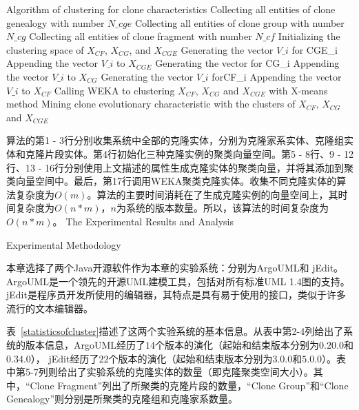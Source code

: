 \vspace{1em}
\begin{minipage}{0.9\textwidth}
\centering
\begin{algorithm}[H]
 {Algorithm of clustering for clone characteristics}
\label{alg-characteristic}
Collecting all entities of clone genealogy with number {$N\_cge$}\;
Collecting all entities of clone group with number{$N\_cg$}\;
Collecting all entities of clone fragment with number {$N\_cf$}\; 
Initializing the clustering space of  $X_{CF}$, $X_{CG}$, and $X_{CGE}$\;
{
 Generating the vector {$V\_i$} for {CGE\_i}\;
 Appending the vector {$V\_i$} to $X_{CGE}$\;
 }
{ 
 Generating the vector for {CG\_i}\;
 Appending the vector {$V\_i$} to $X_{CG}$\;
}
{ 
 Generating the vector {$V\_i$} for{CF\_i}\;
 Appending the vector {$V\_i$} to $X_{CF}$\;
}
Calling WEKA to clustering $X_{CF}$, $X_{CG}$ and  $X_{CGE}$ with X-means method\;
Mining clone evolutionary characteristic with the clusters of $X_{CF}$, $X_{CG}$ and  $X_{CGE}$\;
\end{algorithm}
\end{minipage}
\vspace{1em}

算法的第1 - 3行分别收集系统中全部的克隆实体，分别为克隆家系实体、克隆组实体和克隆片段实体。第4行初始化三种克隆实例的聚类向量空间。第5 - 8行、9 - 12行、13 - 16行分别使用上文描述的属性生成克隆实体的聚类向量，并将其添加到聚类向量空间中。最后，第17行调用WEKA聚类克隆实体。收集不同克隆实体的算法复杂度为$O(m)$。算法的主要时间消耗在了生成克隆实例的向量空间上，其时间复杂度为$O(n*m)$，$n$为系统的版本数量。所以，该算法的时间复杂度为$O(n*m)$。
{The Experimental Results and Analysis}
\label{ref-characteristics}

{Experimental Methodology}

本章选择了两个Java开源软件作为本章的实验系统：分别为ArgoUML和 jEdit。ArgoUML是一个领先的开源UML建模工具，包括对所有标准UML 1.4图的支持。jEdit是程序员开发所使用的编辑器，其特点是具有易于使用的接口，类似于许多流行的文本编辑器。

表~\ref{statisticsofcluster}描述了这两个实验系统的基本信息。从表中第2-4列给出了系统的版本信息，ArgoUML经历了$14 $个版本的演化（起始和结束版本分别为$0.20.0$和$0.34.0$）， jEdit经历了$22$个版本的演化（起始和结束版本分别为$3.0.0$和$5.0.0$）。表中第5-7列则给出了实验系统的克隆实体的数量（即克隆聚类空间大小）。其中，“Clone Fragment”列出了所聚类的克隆片段的数量，“Clone Group”和“Clone Genealogy”则分别是所聚类的克隆组和克隆家系数量。

